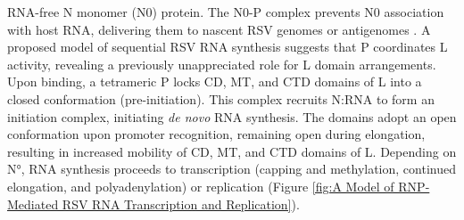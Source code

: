 RNA-free N monomer (N0) protein. The N0-P complex prevents N0 association with host RNA, delivering them to nascent RSV genomes or antigenomes \cite{Castagne2004BiochemicalDomain, Galloux2015IdentificationNucleoprotein}. A proposed model of sequential RSV RNA synthesis suggests that P coordinates L activity, revealing a previously unappreciated role for L domain arrangements. Upon binding, a tetrameric P locks CD, MT, and CTD domains of L into a closed conformation (pre-initiation). This complex recruits N:RNA to form an initiation complex, initiating \textit{de novo} RNA synthesis. The domains adopt an open conformation upon promoter recognition, remaining open during elongation, resulting in increased mobility of CD, MT, and CTD domains of L. Depending on N°, RNA synthesis proceeds to transcription (capping and methylation, continued elongation, and polyadenylation) or replication \cite{Cao2020Cryo-EMPolymerase} (Figure \ref{fig:A Model of RNP-Mediated RSV RNA Transcription and Replication}).

